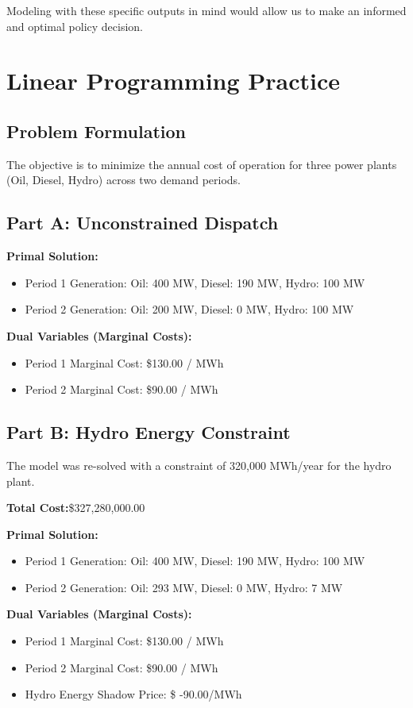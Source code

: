 \documentclass[journal, onecolumn, 12pt]{IEEEtran}
\begin{document}
Modeling with these specific outputs in mind would allow us to make an informed and optimal policy decision. 

\newpage
\section{Linear Programming Practice}

\subsection{Problem Formulation}
The objective is to minimize the annual cost of operation for three power plants (Oil, Diesel, Hydro) across two demand periods.

\subsection{Part A: Unconstrained Dispatch}
\textbf{Primal Solution:}
\begin{itemize}
    \item Period 1 Generation: Oil: 400 MW, Diesel: 190 MW, Hydro: 100 MW
    \item Period 2 Generation: Oil: 200 MW, Diesel: 0 MW, Hydro: 100 MW
\end{itemize}

\textbf{Dual Variables (Marginal Costs):}
\begin{itemize}
    \item Period 1 Marginal Cost: \$130.00 / MWh
    \item Period 2 Marginal Cost: \$90.00 / MWh
\end{itemize}

\subsection{Part B: Hydro Energy Constraint}
The model was re-solved with a constraint of 320,000 MWh/year for the hydro plant.

\textbf{Total Cost:}\$327,280,000.00

\textbf{Primal Solution:}
\begin{itemize}
    \item Period 1 Generation: Oil: 400 MW, Diesel: 190 MW, Hydro: 100 MW
    \item Period 2 Generation: Oil: 293 MW, Diesel: 0 MW, Hydro: 7 MW
\end{itemize}

\textbf{Dual Variables (Marginal Costs):}
\begin{itemize}
    \item Period 1 Marginal Cost: \$130.00 / MWh
    \item Period 2 Marginal Cost: \$90.00 / MWh\\
    \item Hydro Energy Shadow Price: \$ -90.00/MWh
\end{itemize}
\end{document}
